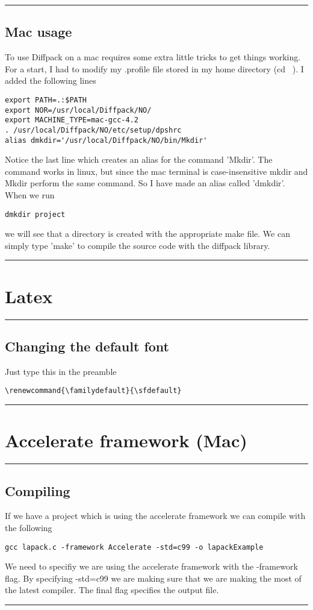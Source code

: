 \documentclass[a4paper, 10pt]{article}
\renewcommand{\familydefault}{\sfdefault}
\newcommand{\mytoprule}{\hrule\vspace{4mm}}
\newcommand{\mybotrule}{\vspace{4mm}\hrule}
\begin{document}
\mytoprule
\subsection*{Mac usage}

To use Diffpack on a mac requires some extra little tricks to get things working. For a start, I had to modify my .profile file stored in my home directory (cd ~). I added the following lines
\begin{verbatim}
export PATH=.:$PATH
export NOR=/usr/local/Diffpack/NO/
export MACHINE_TYPE=mac-gcc-4.2
. /usr/local/Diffpack/NO/etc/setup/dpshrc
alias dmkdir='/usr/local/Diffpack/NO/bin/Mkdir'
\end{verbatim}
Notice the last line which creates an alias for the command 'Mkdir'. The command works in linux, but since the mac terminal is case-insensitive mkdir and Mkdir perform the same command. So I have made an alias called 'dmkdir'. When we run 
\begin{verbatim}
dmkdir project
\end{verbatim}
we will see that a directory is created with the appropriate make file. We can simply type 'make' to compile the source code with the diffpack library.
\mybotrule


\vspace{10mm}
\section*{Latex}

\mytoprule
\subsection*{Changing the default font}
Just type this in the preamble
\begin{Verbatim}
\renewcommand{\familydefault}{\sfdefault}
\end{Verbatim}

\mybotrule

\vspace{10mm}
\section*{Accelerate framework (Mac)}

\mytoprule
\subsection*{Compiling}
If we have a project which is using the accelerate framework we can compile with the following
\begin{Verbatim}
gcc lapack.c -framework Accelerate -std=c99 -o lapackExample
\end{Verbatim}
We need to specifiy we are using the accelerate framework with the -framework flag. By specifying -std=c99 we are making sure that we are making the most of the latest compiler. The final flag specifies the output file. 
\mybotrule
\end{document}
